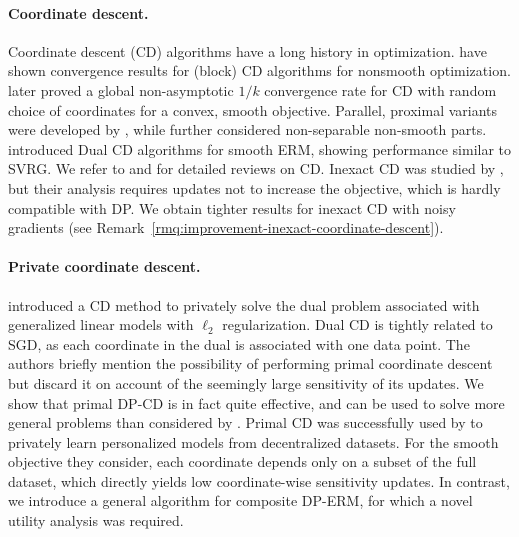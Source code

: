 \paragraph{Coordinate descent.}
Coordinate descent (CD) algorithms have a long history in optimization.
\citet{Luo_Tseng1992,Tseng01,Tseng_Yun09} have shown convergence results for
(block) CD algorithms for nonsmooth optimization.
\citet{Nesterov12} later proved a global non-asymptotic $1/k$ convergence
rate for CD with random choice of coordinates for a convex, smooth objective.
Parallel, proximal variants were developed by
\citet{richtarik2014Iteration,fercoq2014Accelerated}, while
\citet{hanzely2018SEGA} further considered non-separable non-smooth parts.
\citet{shalev-shwartz2013Stochastic} introduced Dual CD algorithms
for smooth ERM, showing performance similar to SVRG.
We refer to \citet{wright2015Coordinate} and \citet{shi2017Primer} for
detailed reviews on CD.
Inexact CD was studied by \citet{tappenden2016Inexact}, but their analysis
requires updates not to increase the objective, which is hardly compatible
with DP.
We obtain tighter results for inexact CD with noisy gradients
(see Remark~\ref{rmq:improvement-inexact-coordinate-descent}).



\paragraph{Private coordinate descent.}
\citet{damaskinos2021Differentially} introduced a CD method to privately solve
the dual problem associated with generalized linear models with $\ell_2$
regularization. Dual CD is tightly related to SGD, as each
coordinate in the dual is associated with one data point.
The authors briefly mention the possibility of performing primal coordinate
descent but discard it on account of the seemingly large sensitivity of its
updates.
We show that primal DP-CD is in fact quite effective, and can be used to solve more general problems than considered by \citet{damaskinos2021Differentially}.
Primal CD was successfully used by \citet{bellet2018Personalized} to privately learn personalized models from decentralized datasets.
For the smooth objective they consider,
each coordinate depends only on a subset of the full dataset, which directly
yields low coordinate-wise sensitivity updates.
In contrast, we introduce a general algorithm for composite DP-ERM, for which
a novel utility analysis was required.

